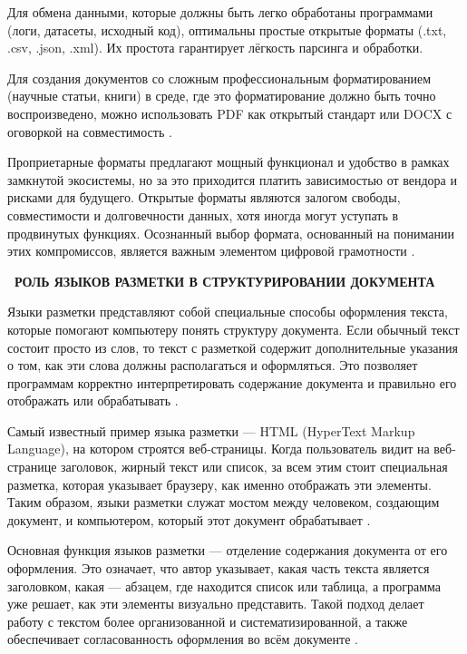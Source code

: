 \documentclass{SibFU-docs}
\begin{document}
Для обмена данными, которые должны быть легко обработаны программами (логи, датасеты, исходный код), оптимальны простые открытые форматы (.txt, .csv, .json, .xml). Их простота гарантирует лёгкость парсинга и обработки.

Для создания документов со сложным профессиональным форматированием (научные статьи, книги) в среде, где это форматирование должно быть точно воспроизведено, можно использовать PDF как открытый стандарт или DOCX с оговоркой на совместимость \cite{iso32000, ecma376}.

Проприетарные форматы предлагают мощный функционал и удобство в рамках замкнутой экосистемы, но за это приходится платить зависимостью от вендора и рисками для будущего. Открытые форматы являются залогом свободы, совместимости и долговечности данных, хотя иногда могут уступать в продвинутых функциях. Осознанный выбор формата, основанный на понимании этих компромиссов, является важным элементом цифровой грамотности \cite{gnu2024, voronov2020}.

\newpage
{}
\begin{center}\textbf{\thesection\ РОЛЬ ЯЗЫКОВ РАЗМЕТКИ В СТРУКТУРИРОВАНИИ ДОКУМЕНТА}\end{center}
\vspace*{-1.5em}


Языки разметки представляют собой специальные способы оформления текста, которые помогают компьютеру понять структуру документа. Если обычный текст состоит просто из слов, то текст с разметкой содержит дополнительные указания о том, как эти слова должны располагаться и оформляться. Это позволяет программам корректно интерпретировать содержание документа и правильно его отображать или обрабатывать \cite{knuth1984texbook, grune2012markup}.

Самый известный пример языка разметки — HTML (HyperText Markup Language), на котором строятся веб-страницы. Когда пользователь видит на веб-странице заголовок, жирный текст или список, за всем этим стоит специальная разметка, которая указывает браузеру, как именно отображать эти элементы. Таким образом, языки разметки служат мостом между человеком, создающим документ, и компьютером, который этот документ обрабатывает \cite{bernerslee1992html, w3c_html}.

Основная функция языков разметки — отделение содержания документа от его оформления. Это означает, что автор указывает, какая часть текста является заголовком, какая — абзацем, где находится список или таблица, а программа уже решает, как эти элементы визуально представить. Такой подход делает работу с текстом более организованной и систематизированной, а также обеспечивает согласованность оформления во всём документе \cite{latex_project, xml_w3c}.
\end{document}
